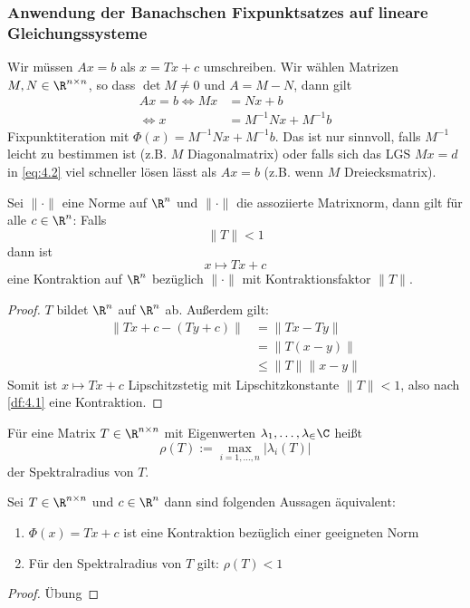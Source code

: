 \documentclass[a4paper]{scrartcl}
\numberwithin{equation}{section}
\begin{document}
\subsubsection*{Anwendung der Banachschen Fixpunktsatzes auf lineare Gleichungssysteme}

Wir müssen $Ax=b$ als $x=Tx+c$ umschreiben.
Wir wählen Matrizen $M,N\in \R^{n\times n}$, so dass $\det M\neq 0$ und $A=M-N$, dann gilt
\begin{align}
	\label{eq:4.2}
	Ax=b \iff Mx &= Nx +b\\
	\iff x &= M^{-1}Nx + M^{-1}b
\end{align}
Fixpunktiteration mit $\Phi(x) = M^{-1}Nx + M^{-1}b$.
Das ist nur sinnvoll, falls $M^{-1}$ leicht zu bestimmen ist (z.B. $M$ Diagonalmatrix) oder falls sich das LGS $Mx=d$ in \ref{eq:4.2} viel schneller lösen lässt als $Ax=b$ (z.B. wenn $M$ Dreiecksmatrix).

\begin{lem}
	\label{lem:4.3}
	Sei $\|\cdot\|$ eine Norme auf $\R^n$ und $\|\cdot\|$ die assoziierte Matrixnorm, dann gilt für alle $c\in \R^n$:
	Falls
	\[
		\|T\| < 1
	\]
	dann ist
	\[
		x\mapsto Tx +c
	\]
	eine Kontraktion auf $\R^n$ bezüglich $\|\cdot\|$ mit Kontraktionsfaktor $\|T\|$.
	\begin{proof}
		$T$ bildet $\R^n$ auf $\R^n$ ab.
		Außerdem gilt:
		\begin{align*}
			\|Tx+c - (Ty+c)\| &= \| Tx -Ty\| \\
							  &= \|T(x-y)\| \\
				  &\le \|T\|\|x-y\|
		\end{align*}
		Somit ist $x\mapsto Tx+c$ Lipschitzstetig mit Lipschitzkonstante $\|T\|<1$, also nach \ref{df:4.1} eine Kontraktion.
	\end{proof}
\end{lem}

\begin{df}
	\label{df:4.5}
	Für eine Matrix $T\in \R^{n\times n}$ mit Eigenwerten $\lambda_1, \dotsc, \lambda_ \in \C$
	heißt 
	\[
		\rho(T) := \max_{i=1,\dotsc,n}|\lambda_i(T)|
	\]
	der Spektralradius von $T$.
\end{df}

\begin{lem}
	\label{lem:4.4}
	Sei $T\in \R^{n\times n}$ und $c\in \R^n$ dann sind folgenden Aussagen äquivalent:
	\begin{enumerate}
		\item $\Phi(x) = Tx+c$ ist eine Kontraktion bezüglich einer geeigneten Norm
		\item Für den Spektralradius von $T$ gilt: $\rho(T) < 1$
	\end{enumerate}
	\begin{proof}
		Übung
	\end{proof}
\end{lem}
\end{document}
